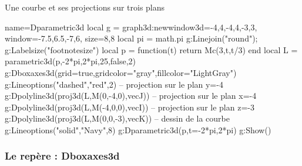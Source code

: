 \begin{demo}{Une courbe et ses projections sur trois plans} 
\begin{luadraw}{name=Dparametric3d}
local g = graph3d:new{window3d={-4,4,-4,4,-3,3}, window={-7.5,6.5,-7,6}, size={8,8}}
local pi = math.pi
g:Linejoin("round"); g:Labelsize("footnotesize")
local p = function(t) return Mc(3,t,t/3) end
local L = parametric3d(p,-2*pi,2*pi,25,false,2)
g:Dboxaxes3d({grid=true,gridcolor="gray",fillcolor="LightGray"})
g:Lineoptions("dashed","red",2)
-- projection sur le plan y=-4
g:Dpolyline3d(proj3d(L,{M(0,-4,0),vecJ}))
-- projection sur le plan x=-4
g:Dpolyline3d(proj3d(L,{M(-4,0,0),vecI}))
-- projection sur le plan z=-3
g:Dpolyline3d(proj3d(L,{M(0,0,-3),vecK}))
-- dessin de la courbe
g:Lineoptions("solid","Navy",8)
g:Dparametric3d(p,{t={-2*pi,2*pi}})
g:Show()
\end{luadraw}
\end{demo}

\subsubsection{Le repère : Dboxaxes3d}

